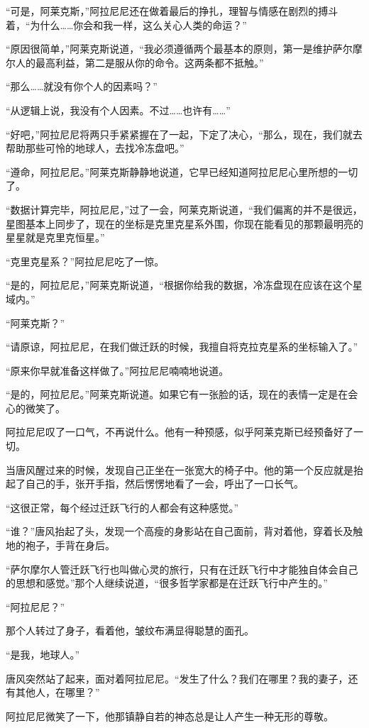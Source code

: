 “可是，阿莱克斯，”阿拉尼尼还在做着最后的挣扎，理智与情感在剧烈的搏斗着，“为什么……你会和我一样，这么关心人类的命运？”

“原因很简单，”阿莱克斯说道，“我必须遵循两个最基本的原则，第一是维护萨尔摩尔人的最高利益，第二是服从你的命令。这两条都不抵触。”

“那么……就没有你个人的因素吗？”

“从逻辑上说，我没有个人因素。不过……也许有……”

“好吧，”阿拉尼尼将两只手紧紧握在了一起，下定了决心，“那么，现在，我们就去帮助那些可怜的地球人，去找冷冻盘吧。”

“遵命，阿拉尼尼。”阿莱克斯静静地说道，它早已经知道阿拉尼尼心里所想的一切了。

“数据计算完毕，阿拉尼尼，”过了一会，阿莱克斯说道，“我们偏离的并不是很远，星图基本上同步了，现在的坐标是克里克星系外围，你现在能看见的那颗最明亮的星星就是克里克恒星。”

“克里克星系？”阿拉尼尼吃了一惊。

“是的，阿拉尼尼，”阿莱克斯说道，“根据你给我的数据，冷冻盘现在应该在这个星域内。”

“阿莱克斯？”

“请原谅，阿拉尼尼，在我们做迁跃的时候，我擅自将克拉克星系的坐标输入了。”

“原来你早就准备这样做了。”阿拉尼尼喃喃地说道。

“是的，阿拉尼尼。”阿莱克斯说道。如果它有一张脸的话，现在的表情一定是在会心的微笑了。

阿拉尼尼叹了一口气，不再说什么。他有一种预感，似乎阿莱克斯已经预备好了一切。

当唐风醒过来的时候，发现自己正坐在一张宽大的椅子中。他的第一个反应就是抬起了自己的手，张开手指，然后愣愣地看了一会，呼出了一口长气。

“这很正常，每个经过迁跃飞行的人都会有这种感觉。”

“谁？”唐风抬起了头，发现一个高瘦的身影站在自己面前，背对着他，穿着长及触地的袍子，手背在身后。

“萨尔摩尔人管迁跃飞行也叫做心灵的旅行，只有在迁跃飞行中才能独自体会自己的思想和感觉。”那个人继续说道，“很多哲学家都是在迁跃飞行中产生的。”

“阿拉尼尼？”

那个人转过了身子，看着他，皱纹布满显得聪慧的面孔。

“是我，地球人。”

唐风突然站了起来，面对着阿拉尼尼。“发生了什么？我们在哪里？我的妻子，还有其他人，在哪里？”

阿拉尼尼微笑了一下，他那镇静自若的神态总是让人产生一种无形的尊敬。

